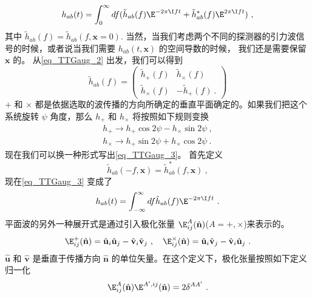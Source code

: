 \begin{equation}\label{eq_TTGaug_3}
h_{ab} (t) = \int^\infty_0 df ( \tilde h_{ab} (f) \E^{-2\pi \I f t} + \tilde h^*_{ab} (f) \E^{2\pi \I f t} ) ~, 
\end{equation}
其中 $\tilde h_{ab}(f) = \tilde h_{ab}(f,\mathbf x = 0)$. 当然，当我们考虑两个不同的探测器的引力波信号的时候，或者说当我们需要 $h_{ab}(t,\mathbf x)$ 的空间导数的时候， 我们还是需要保留 $\mathbf x$ 的。 从\autoref{eq_TTGaug_2} 出发，我们可以得到
\begin{equation}
\tilde h_{ab} (f) = 
\begin{pmatrix}
\tilde h_+(f) & \tilde h_{\times} (f) \\
\tilde h_{\times} (f) & -\tilde h_+ (f) ~.
\end{pmatrix}
\end{equation}
$+$ 和 $\times$ 都是依据选取的波传播的方向所确定的垂直平面确定的。如果我们把这个系统旋转 $\psi$ 角度，那么 $h_+$ 和 $h_{\times}$ 将按照如下规则变换
\begin{equation}
\begin{aligned}
h_+\rightarrow h_+ \cos 2 \psi - h_\times \sin 2 \psi ~, \\
h_\times \rightarrow h_+ \sin 2 \psi + h_\times \cos 2\psi ~.
\end{aligned}
\end{equation}
现在我们可以换一种形式写出\autoref{eq_TTGaug_3}。 首先定义
\begin{equation}
\tilde h_{ab} (-f,\mathbf x) = \tilde h^*_{ab} (f,\mathbf x) ~,
\end{equation}
现在\autoref{eq_TTGaug_3} 变成了
\begin{equation}
h_{ab} (t) = \int_{-\infty}^{\infty} df \tilde h_{ab} (f) \E^{-2\pi \I f t}~. 
\end{equation}
平面波的另外一种展开式是通过引入极化张量 $\E^A_{ij}(\hat{ {\mathbf n} })$($A = +,\times$)来表示的。 
\begin{equation}
\E^+_{ij} (\hat{ {\mathbf n} }) = \hat{{\mathbf u} }_i \hat{{\mathbf u} }_j - \hat{{\mathbf v} }_i \hat{{\mathbf v} }_j~, \quad \E^\times_{ij} (\hat{ {\mathbf n} }) = \hat{{\mathbf u} }_i \hat{{\mathbf v} }_j - \hat{{\mathbf v} }_i \hat{{\mathbf u} }_j ~.
\end{equation}
$\hat{ {\mathbf u} }$ 和 $\hat{ {\mathbf v} }$ 是垂直于传播方向 $\hat{  {\mathbf n}  }$ 的单位矢量。在这个定义下，极化张量按照如下定义归一化
\begin{equation}
\E^A_{ij}(\hat{ {\mathbf n} }) \E^{A',ij} (\hat{ {\mathbf n} }) = 2 \delta^{AA'} ~.  
\end{equation}
